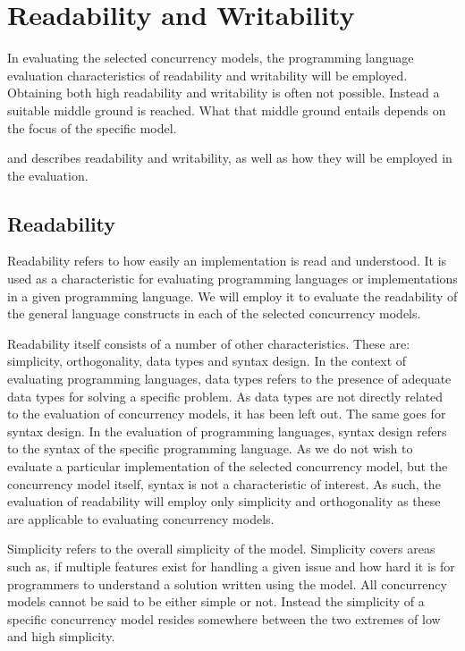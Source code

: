 \section{Readability and Writability}
In evaluating the selected concurrency models, the programming language evaluation characteristics of readability and writability will be employed. Obtaining both high readability and writability is often not possible. Instead a suitable middle ground is reached. What that middle ground entails depends on the focus of the specific model.

 and  describes readability and writability, as well as how they will be employed in the evaluation.

\subsection{Readability}\label{sec:readability}
Readability refers to how easily an implementation is read and understood\cite[p. 8]{sebestaProLang}. It is used as a characteristic for evaluating programming languages or implementations in a given programming language. We will employ it to evaluate the readability of the general language constructs in each of the selected concurrency models.

Readability itself consists of a number of other characteristics. These are: simplicity, orthogonality, data types and syntax design. In the context of evaluating programming languages, data types refers to the presence of adequate data types for solving a specific problem. As data types are not directly related to the evaluation of concurrency models, it has been left out. The same goes for syntax design. In the evaluation of programming languages, syntax design refers to the syntax of the specific programming language. As we do not wish to evaluate a particular implementation of the selected concurrency model, but the concurrency model itself, syntax is not a characteristic of interest. As such, the evaluation of readability will employ only simplicity and orthogonality as these are applicable to evaluating concurrency models.

Simplicity refers to the overall simplicity of the model\cite[p. 8]{sebestaProLang}. Simplicity covers areas such as, if multiple features exist for handling a given issue and how hard it is for programmers to understand a solution written using the model. All concurrency models cannot be said to be either simple or not. Instead the simplicity of a specific concurrency model resides somewhere between the two extremes of low and high simplicity.  

